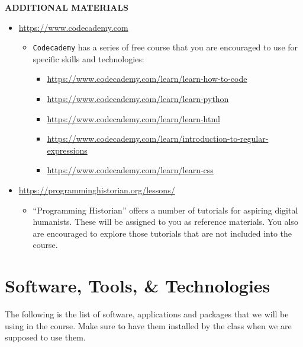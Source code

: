 \documentclass[
]{book}
\providecommand{\tightlist}{%
  \setlength{\itemsep}{0pt}\setlength{\parskip}{0pt}}
\begin{document}
\textbf{ADDITIONAL MATERIALS}

\begin{itemize}
\tightlist
\item
  \url{https://www.codecademy.com}

  \begin{itemize}
  \tightlist
  \item
    \texttt{Codecademy} has a series of free course that you are encouraged to use for specific skills and technologies:

    \begin{itemize}
    \tightlist
    \item
      \url{https://www.codecademy.com/learn/learn-how-to-code}
    \item
      \url{https://www.codecademy.com/learn/learn-python}
    \item
      \url{https://www.codecademy.com/learn/learn-html}
    \item
      \url{https://www.codecademy.com/learn/introduction-to-regular-expressions}
    \item
      \url{https://www.codecademy.com/learn/learn-css}
    \end{itemize}
  \end{itemize}
\item
  \url{https://programminghistorian.org/lessons/}

  \begin{itemize}
  \tightlist
  \item
    ``Programming Historian'' offers a number of tutorials for aspiring digital humanists. These will be assigned to you as reference materials. You also are encouraged to explore those tutorials that are not included into the course.
  \end{itemize}
\end{itemize}

\hypertarget{software-tools-technologies}{%
\section*{Software, Tools, \& Technologies}\label{software-tools-technologies}}

The following is the list of software, applications and packages that we will be using in the course. Make sure to have them installed by the class when we are supposed to use them.
\end{document}
